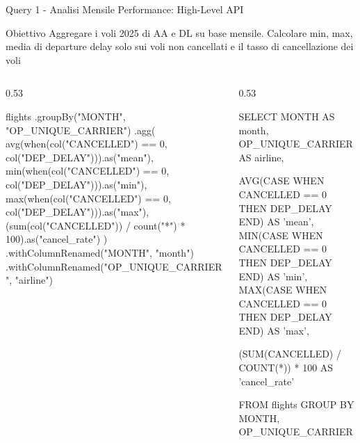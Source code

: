 \documentclass[10pt, aspectratio=169]{beamer}
\newcommand{\queryobjective}[1]{
    \vspace{-0.5cm}
    \begin{exampleblock}{\footnotesize Obiettivo}
    \scriptsize #1
    \end{exampleblock}
    \vfill
}
\begin{document}
\begin{frame}[fragile, t]{Query 1 - Analisi Mensile Performance: High-Level API}

    \queryobjective{Aggregare i voli 2025 di AA e DL su base mensile. Calcolare min, max, media di departure delay solo sui voli non cancellati e il tasso di cancellazione dei voli}

    \begin{columns}[c]

        \begin{column}{0.53\textwidth}
            \begin{dataframecodebox}
flights
  .groupBy("MONTH", "OP_UNIQUE_CARRIER")
  .agg(
    avg(when(col("CANCELLED") == 0, col("DEP_DELAY"))).as("mean"),
    min(when(col("CANCELLED") == 0, col("DEP_DELAY"))).as("min"),
    max(when(col("CANCELLED") == 0, col("DEP_DELAY"))).as("max"),
    (sum(col("CANCELLED")) / count("*") * 100).as("cancel_rate")
  )
  .withColumnRenamed("MONTH", "month")
  .withColumnRenamed("OP_UNIQUE_CARRIER", "airline")
            \end{dataframecodebox}
        \end{column}

        \begin{column}{0.53\textwidth}
            \begin{sqlcodebox}
SELECT
  MONTH             AS month,
  OP_UNIQUE_CARRIER AS airline,

  AVG(CASE WHEN CANCELLED == 0 THEN DEP_DELAY END) AS 'mean',
  MIN(CASE WHEN CANCELLED == 0 THEN DEP_DELAY END) AS 'min',
  MAX(CASE WHEN CANCELLED == 0 THEN DEP_DELAY END) AS 'max',

  (SUM(CANCELLED) / COUNT(*)) * 100 AS 'cancel_rate'

FROM flights
GROUP BY MONTH, OP_UNIQUE_CARRIER
            \end{sqlcodebox}
        \end{column}

    \end{columns}

\end{frame}
\end{document}
